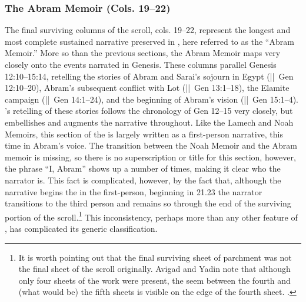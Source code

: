 \subsubsection{The Abram Memoir (Cols. 19--22)}

The final surviving columns of the scroll, cols. 19--22, represent the longest and most complete sustained narrative preserved in \ga, here referred to as the ``Abram Memoir.'' More so than the previous sections, the Abram Memoir maps very closely onto the events narrated in Genesis. These columns parallel Genesis 12:10--15:14, retelling the stories of Abram and Sarai's sojourn in Egypt (||~Gen 12:10--20), Abram's subsequent conflict with Lot (||~Gen 13:1--18), the Elamite campaign (||~Gen 14:1--24), and the beginning of Abram's vision (||~Gen 15:1--4). \ga's retelling of these stories follows the chronology of Gen 12--15 very closely, but embellishes and augments the narrative throughout. Like the Lamech and Noah Memoirs, this section of the \ga is largely written as a first-person narrative, this time in Abram's voice. The transition between the Noah Memoir and the Abram memoir is missing, so there is no superscription or title for this section, however, the phrase ``I, Abram'' shows up a number of times, making it clear who the narrator is. This fact is complicated, however, by the fact that, although the narrative begins the in the first-person, beginning in 21.23 the narrator transitions to the third person and remains so through the end of the surviving portion of the scroll.\footnote{It is worth pointing out that the final surviving sheet of parchment was not the final sheet of the scroll originally. Avigad and Yadin note that although only four sheets of the work were present, the seem between the fourth and (what would be) the fifth sheets is visible on the edge of the fourth sheet. \cite*[14]{avigad-yadin1956}.} This inconsistency, perhaps more than any other feature of \ga, has complicated its generic classification.

